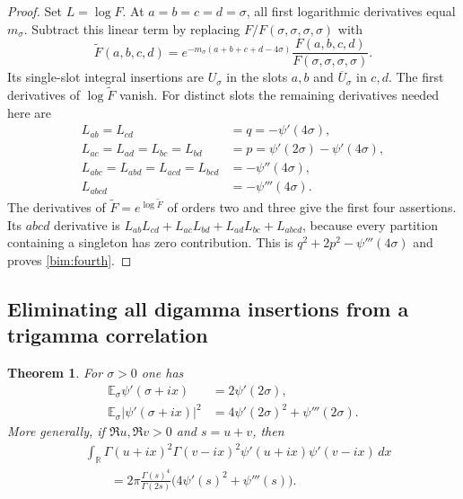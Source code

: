 \documentclass[11pt,a4paper]{article}
\numberwithin{equation}{section}
\newtheorem{theorem}{Theorem}[section]
\theoremstyle{definition}
\theoremstyle{remark}
\begin{document}
\begin{proof}
Set $L=\log F$.  At $a=b=c=d=\sigma$, all first logarithmic
derivatives equal $m_\sigma$.  Subtract this linear term by replacing
$F/F(\sigma,\sigma,\sigma,\sigma)$ with
\[
 \widetilde F(a,b,c,d)
 =e^{-m_\sigma(a+b+c+d-4\sigma)}
      \frac{F(a,b,c,d)}{F(\sigma,\sigma,\sigma,\sigma)}.
\]
Its single-slot integral insertions are $U_\sigma$ in the slots $a,b$
and $\overline U_\sigma$ in $c,d$.  The first derivatives of
$\log\widetilde F$ vanish.  For distinct slots the remaining derivatives
needed here are
\begin{align*}
 L_{ab}=L_{cd}&=q=-\psi'(4\sigma),\\
 L_{ac}=L_{ad}=L_{bc}=L_{bd}
      &=p=\psi'(2\sigma)-\psi'(4\sigma),\\
 L_{abc}=L_{abd}=L_{acd}=L_{bcd}&=-\psi''(4\sigma),\\
 L_{abcd}&=-\psi'''(4\sigma).
\end{align*}
The derivatives of $\widetilde F=e^{\log\widetilde F}$ of orders two
and three give the first four assertions.  Its $abcd$ derivative is
$L_{ab}L_{cd}+L_{ac}L_{bd}+L_{ad}L_{bc}+L_{abcd}$, because every
partition containing a singleton has zero contribution.  This is
$q^2+2p^2-\psi'''(4\sigma)$ and proves \eqref{bim:fourth}.
\end{proof}

\subsection{Eliminating all digamma insertions from a trigamma correlation}

\begin{theorem}\label{bim:trigamma}
For $\sigma>0$ one has
\begin{align}
 \mathbb E_\sigma\psi'(\sigma+ix)&=2\psi'(2\sigma),
                                                   \label{bim:trigamma-mean}\\
 \mathbb E_\sigma\left|\psi'(\sigma+ix)\right|^2
                  &=4\psi'(2\sigma)^2+\psi'''(2\sigma).
                                                   \label{bim:trigamma-square}
\end{align}
More generally, if $\Re u,\Re v>0$ and $s=u+v$, then
\begin{equation}\label{bim:unequal-trigamma}
\begin{split}
 &\int_{\mathbb R}\Gamma(u+ix)^2\Gamma(v-ix)^2
                         \psi'(u+ix)\psi'(v-ix)\,dx\\
 &\qquad=2\pi\frac{\Gamma(s)^4}{\Gamma(2s)}
                           \bigl(4\psi'(s)^2+\psi'''(s)\bigr).
\end{split}
\end{equation}
\end{theorem}
\end{document}
